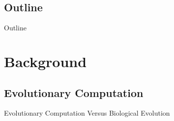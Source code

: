 \documentclass{beamer}
\begin{document}
\subsection*{Outline}

\begin{frame}{Outline}
  \tableofcontents[hideallsubsections]
\end{frame}


\section[Background]{Background}

\subsection[Evolutionary Computation]{Evolutionary Computation}
\begin{frame}{Evolutionary Computation Versus Biological Evolution}
\end{frame}
\end{document}
